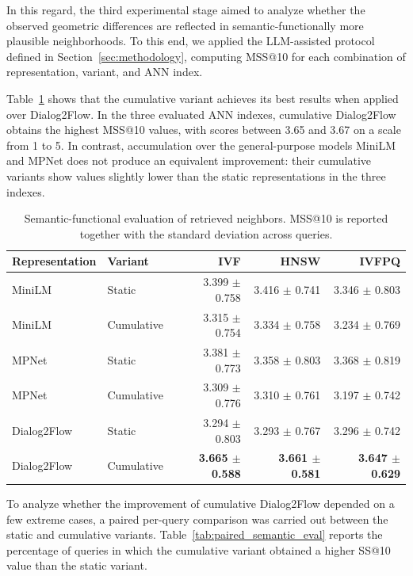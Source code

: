 \documentclass[runningheads]{llncs}
\begin{document}
In this regard, the third experimental stage aimed to analyze whether the observed geometric differences are reflected in semantic-functionally more plausible neighborhoods. To this end, we applied the LLM-assisted protocol defined in Section~\ref{sec:methodology}, computing MSS@10 for each combination of representation, variant, and ANN index.

Table~\ref{tab:mss_semantic_eval} shows that the cumulative variant achieves its best results when applied over Dialog2Flow. In the three evaluated ANN indexes, cumulative Dialog2Flow obtains the highest MSS@10 values, with scores between 3.65 and 3.67 on a scale from 1 to 5. In contrast, accumulation over the general-purpose models MiniLM and MPNet does not produce an equivalent improvement: their cumulative variants show values slightly lower than the static representations in the three indexes.

\begin{table}[ht]
\centering
\small
\setlength{\tabcolsep}{5pt}
\caption{Semantic-functional evaluation of retrieved neighbors. MSS@10 is reported together with the standard deviation across queries.}
\label{tab:mss_semantic_eval}
\begin{tabular}{llrrr}
\toprule
Representation & Variant & IVF & HNSW & IVFPQ \\
\midrule
MiniLM & Static & 3.399 $\pm$ 0.758 & 3.416 $\pm$ 0.741 & 3.346 $\pm$ 0.803 \\
MiniLM & Cumulative & 3.315 $\pm$ 0.754 & 3.334 $\pm$ 0.758 & 3.234 $\pm$ 0.769 \\
\midrule
MPNet & Static & 3.381 $\pm$ 0.773 & 3.358 $\pm$ 0.803 & 3.368 $\pm$ 0.819 \\
MPNet & Cumulative & 3.309 $\pm$ 0.776 & 3.310 $\pm$ 0.761 & 3.197 $\pm$ 0.742 \\
\midrule
Dialog2Flow & Static & 3.294 $\pm$ 0.803 & 3.293 $\pm$ 0.767 & 3.296 $\pm$ 0.742 \\
Dialog2Flow & Cumulative & \textbf{3.665 $\pm$ 0.588} & \textbf{3.661 $\pm$ 0.581} & \textbf{3.647 $\pm$ 0.629} \\
\bottomrule
\end{tabular}
\end{table}

To analyze whether the improvement of cumulative Dialog2Flow depended on a few extreme cases, a paired per-query comparison was carried out between the static and cumulative variants. Table~\ref{tab:paired_semantic_eval} reports the percentage of queries in which the cumulative variant obtained a higher SS@10 value than the static variant.
\end{document}
